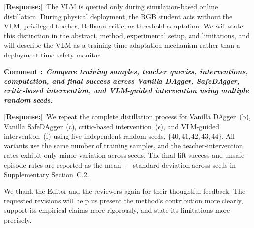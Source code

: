 \documentclass[12pt]{article}
\newcommand{\response}{\par\smallskip\noindent\textbf{[Response:]}\ }
\newcommand{\responsetableinput}[1]{%
  \begingroup
  \let\small\footnotesize
  \let\normalsize\footnotesize
  \endgroup
}
\newcounter{reviewcomment}
\newcounter{reviewer}
\newcommand{\reviewcomment}[1]{%
  \refstepcounter{reviewcomment}
  \par\smallskip\noindent\textbf{Comment \thereviewcomment:}\
  \textbf{\itshape #1}\par
}
\begin{document}
\response The VLM is queried only during simulation-based online distillation.
During physical deployment, the RGB student acts without the VLM, privileged
teacher, Bellman critic, or threshold adaptation. We will state this distinction
in the abstract, method, experimental setup, and limitations, and will describe
the VLM as a training-time adaptation mechanism rather than a deployment-time
safety monitor.

\reviewcomment{Compare training samples, teacher queries, interventions,
computation, and final success across Vanilla DAgger, SafeDAgger, critic-based
intervention, and VLM-guided intervention using multiple random seeds.}

\response We repeat the complete distillation process for Vanilla DAgger~(b),
Vanilla SafeDAgger~(c), critic-based intervention~(e), and VLM-guided
intervention~(f) using five independent random seeds,
$\{40,41,42,43,44\}$. All variants use the same number of training samples, and
the teacher-intervention rates exhibit only minor variation across seeds. The
final lift-success and unsafe-episode rates are reported as the mean~$\pm$~standard
deviation across seeds in Supplementary Section~C.2.

\responsetableinput{../../../table/appendix_ablation_across_seeds.tex}

\vspace{1em}
We thank the Editor and the reviewers again for their thoughtful feedback. The
requested revisions will help us present the method's contribution more clearly,
support its empirical claims more rigorously, and state its limitations more
precisely.
\end{document}
